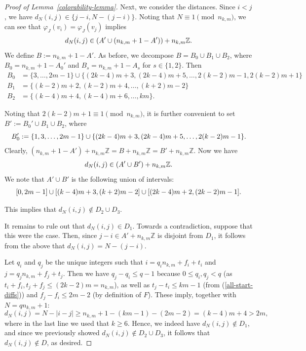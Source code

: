 \documentclass[a4paper,10pt,hidelinks]{amsart}
\newcommand{\Z}{\mathbb{Z}}
\theoremstyle{definition}
\begin{document}
\begin{proof}[Proof of Lemma~\ref{colorability-lemma}]
    Next, we consider the distances. Since $i<j$, we have $d_N(i, j) \in \{j - i, N - (j - i)\}$. Noting that $N \equiv 1 \pmod{n_{k,m}}$, we can see that $\varphi_J(v_i) = \varphi_J(v_j)$ implies
    \begin{equation}\notag
        d_N(i, j) \in (A' \cup (n_{k,m} + 1 - A')) + n_{k,m}\mathbb{Z}.
    \end{equation}    
    We define $B:= n_{k, m} + 1 - A'$. As before, we decompose $B = B_0 \cup B_1 \cup B_2$, where $B_0 = n_{k,m} + 1 - A_0'$ and $B_s = n_{k,m} + 1 - A_s$ for $s\in\{1,2\}$. Then
    \begin{align*}
    B_0 &= \{3, \dots, 2m - 1\} \cup \{(2k - 4)m + 3, (2k - 4)m + 5, \dots, 2(k-2)m - 1,2(k-2)m+1\} \\
    B_1 &= \{(k - 2)m + 2, (k - 2)m + 4, \dots, (k + 2)m - 2\}\\
    B_2 &= \{(k - 4)m + 4, (k - 4)m + 6, \dots, km\}.
    \end{align*}

    Noting that $2(k-2)m+1\equiv 1\pmod{n_{k,m}}$, it is further convenient to set $B':=B_0'\cup B_1\cup B_2$, where 
    \begin{equation}\notag
        B_0' := \{1,3, \dots, 2m - 1\} \cup \{(2k - 4)m + 3, (2k - 4)m + 5, \dots, 2(k-2)m - 1\}.
    \end{equation}
Clearly, $(n_{k,m}+1-A')+n_{k,m}\mathbb{Z}=B+n_{k,m}\mathbb{Z}=B'+n_{k,m}\mathbb{Z}$. 
    Now we have
    \begin{equation}\notag
    d_N(i, j) \in (A' \cup B')+ n_{k, m}\mathbb{Z}. 
    \end{equation}
    We note that $A' \cup B'$ is the following union of intervals:
    \begin{equation}\notag
     [0, 2m - 1] \cup [(k - 4)m + 3, (k + 2)m - 2] \cup [(2k - 4)m + 2, (2k-2)m -1]. 
    \end{equation}

    This implies that $d_N(i,j)\notin D_2\cup D_3$. 
    
    It remains to rule out that $d_N(i, j) \in D_1$. Towards a contradiction, suppose that this were the case. Then, since $j-i\in A' + n_{k,m}\Z$ is disjoint from $D_1$, it follows from the above that $d_N(i, j) = N-(j-i)$. 
    
    Let $q_i$ and $q_j$ be the unique integers such that $i = q_in_{k, m} + f_i+t_i$ and $j = q_jn_{k,m}+f_j+t_j $. Then we have $q_j - q_i \leq q - 1$ because $0\leq q_i, q_j < q$ (as $t_i+f_i,t_j+f_j\le (2k-2)m=n_{k,m}$), as well as $t_j - t_i \leq km - 1$ (from (\ref{all-start-diffs})) and $f_j - f_i \leq 2m - 2$ (by definition of $F$). These imply, together with $N = qn_{k,m} + 1$: 
    \begin{equation*}
        d_N(i, j) = N - |i-j| \geq n_{k, m} + 1 - (km - 1) - (2m - 2) = (k-4)m + 4 > 2m,
    \end{equation*}
    where in the last line we used that $k \geq 6$. Hence, we indeed have $d_N(i,j)\notin D_1$, and since we previously showed $d_N(i,j)\notin D_2\cup D_3$, it follows that $d_N(i,j)\notin D$, as desired.


\end{proof}
\end{document}
